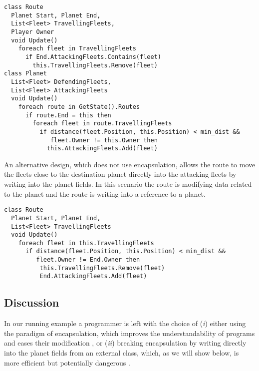 \begin{lstlisting}
class Route
  Planet Start, Planet End,
  List<Fleet> TravellingFleets,
  Player Owner
  void Update()
    foreach fleet in TravellingFleets
      if End.AttackingFleets.Contains(fleet)
        this.TravellingFleets.Remove(fleet)
class Planet
  List<Fleet> DefendingFleets,
  List<Fleet> AttackingFleets
  void Update()
    foreach route in GetState().Routes
      if route.End = this then
        foreach fleet in route.TravellingFleets
          if distance(fleet.Position, this.Position) < min_dist && 
             fleet.Owner != this.Owner then
            this.AttackingFleets.Add(fleet)
\end{lstlisting}


An alternative design, which does not use encapsulation, allows the route to move the fleets close to the destination planet directly into the attacking fleets by writing into the planet fields. In this scenario the route is modifying data related to the planet and the route is writing into a reference to a planet.
\begin{lstlisting}
class Route
  Planet Start, Planet End,
  List<Fleet> TravellingFleets
  void Update()
    foreach fleet in this.TravellingFleets
      if distance(fleet.Position, this.Position) < min_dist && 
         fleet.Owner != End.Owner then
          this.TravellingFleets.Remove(fleet)
          End.AttackingFleets.Add(fleet)
\end{lstlisting}
\subsection{Discussion}
In our running example a programmer is left with the choice of (\textit{i}) either using the paradigm of encapsulation, which improves the understandability of programs and eases their modification \cite{ENCAPSULATION_AND_INHERITANCE_IN_OOP}, or (\textit{ii}) breaking encapsulation by writing directly into the planet fields from an external class, which, as we will show below, is more efficient but potentially dangerous \cite{eder1994coupling}.

